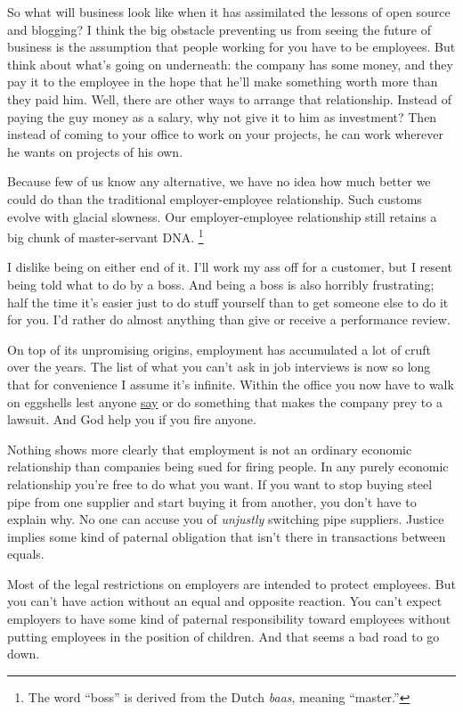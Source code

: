 \documentclass[12pt]{book}
\begin{document}
So what will business look like when it has assimilated the lessons of
open source and blogging? I think the big obstacle preventing us from
seeing the future of business is the assumption that people working for
you have to be employees. But think about what's going on underneath:
the company has some money, and they pay it to the employee in the hope
that he'll make something worth more than they paid him. Well, there are
other ways to arrange that relationship. Instead of paying the guy money
as a salary, why not give it to him as investment? Then instead of
coming to your office to work on your projects, he can work wherever he
wants on projects of his own.

Because few of us know any alternative, we have no idea how much better
we could do than the traditional employer-employee relationship. Such
customs evolve with glacial slowness. Our employer-employee relationship
still retains a big chunk of master-servant DNA. \footnote{The word ``boss'' is derived from the Dutch \emph{baas}, meaning
``master.''}

I dislike being on either end of it. I'll work my ass off for a
customer, but I resent being told what to do by a boss. And being a boss
is also horribly frustrating; half the time it's easier just to do stuff
yourself than to get someone else to do it for you. I'd rather do almost
anything than give or receive a performance review.

On top of its unpromising origins, employment has accumulated a lot of
cruft over the years. The list of what you can't ask in job interviews
is now so long that for convenience I assume it's infinite. Within the
office you now have to walk on eggshells lest anyone
\href{say.html}{say} or do something that makes the company prey to a
lawsuit. And God help you if you fire anyone.

Nothing shows more clearly that employment is not an ordinary economic
relationship than companies being sued for firing people. In any purely
economic relationship you're free to do what you want. If you want to
stop buying steel pipe from one supplier and start buying it from
another, you don't have to explain why. No one can accuse you of
\emph{unjustly} switching pipe suppliers. Justice implies some kind of
paternal obligation that isn't there in transactions between equals.

Most of the legal restrictions on employers are intended to protect
employees. But you can't have action without an equal and opposite
reaction. You can't expect employers to have some kind of paternal
responsibility toward employees without putting employees in the
position of children. And that seems a bad road to go down.
\end{document}
